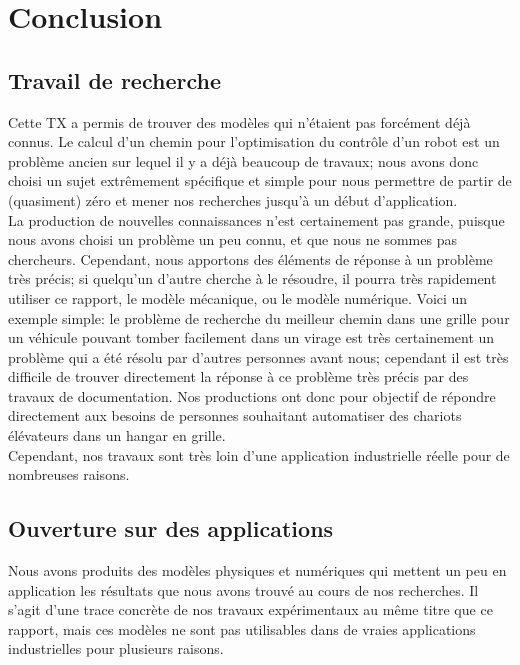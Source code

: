 \section{Conclusion}
\subsection{Travail de recherche}
Cette TX a permis de trouver des modèles qui n'étaient pas forcément déjà connus. Le calcul d'un chemin pour l'optimisation du contrôle d'un robot est un problème ancien sur lequel il y a déjà beaucoup de travaux; nous avons donc choisi un sujet extrêmement spécifique et simple pour nous permettre de partir de (quasiment) zéro et mener nos recherches jusqu'à un début d'application.\\
La production de nouvelles connaissances n'est certainement pas grande, puisque nous avons choisi un problème un peu connu, et que nous ne sommes pas chercheurs. Cependant, nous apportons des éléments de réponse à un problème très précis; si quelqu'un d'autre cherche à le résoudre, il pourra très rapidement utiliser ce rapport, le modèle mécanique, ou le modèle numérique. Voici un exemple simple: le problème de recherche du meilleur chemin dans une grille pour un véhicule pouvant tomber facilement dans un virage est très certainement un problème qui a été résolu par d'autres personnes avant nous; cependant il est très difficile de trouver directement la réponse à ce problème très précis par des travaux de documentation. Nos productions ont donc pour objectif de répondre directement aux besoins de personnes souhaitant automatiser des chariots élévateurs dans un hangar en grille.\\
Cependant, nos travaux sont très loin d'une application industrielle réelle pour de nombreuses raisons.
\subsection{Ouverture sur des applications}
Nous avons produits des modèles physiques et numériques qui mettent un peu en application les résultats que nous avons trouvé au cours de nos recherches. Il s'agit d'une trace concrète de nos travaux expérimentaux au même titre que ce rapport, mais ces modèles ne sont pas utilisables dans de vraies applications industrielles pour plusieurs raisons.
